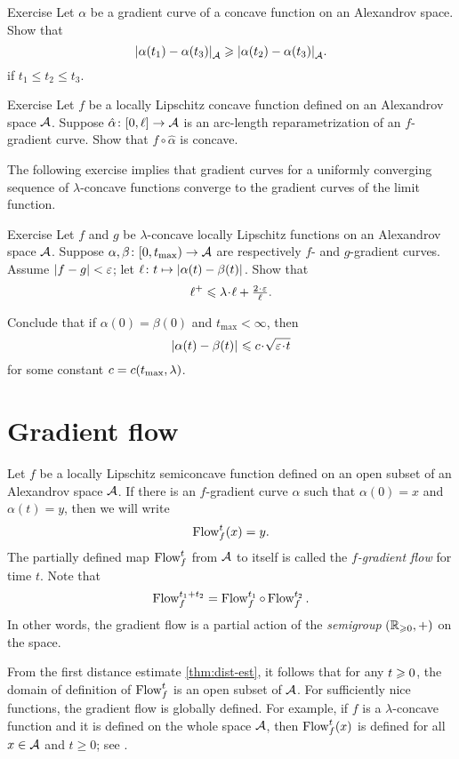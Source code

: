 \begin{thm}{Exercise}\label{ex:elf-contracting}
Let $\alpha$ be a gradient curve of a concave function on an Alexandrov space.
Show that
\[|{\alpha(t_1)}-{\alpha(t_3)}|_{\mathcal{A}}^{{}}\geqslant |{\alpha(t_2)}-{\alpha(t_3)}|_{\mathcal{A}}^{{}}.\]
if $t_1\le t_2\le t_3$.
\end{thm}

\begin{thm}{Exercise}\label{ex:mayer}
Let $f$ be a locally Lipschitz concave function defined on an Alexandrov space $\mathcal{A}$.
Suppose $\hat\alpha\colon[0,\ell]\to\mathcal{A}$ is an arc-length reparametrization of an $f$-gradient curve.
Show that $f\circ\hat\alpha$ is concave.
\end{thm}




The following exercise implies that gradient curves for a uniformly converging sequence of $\lambda$-concave functions converge to the gradient curves of the limit function.

\begin{thm}{Exercise}\label{lem:fg-dist-est}
Let $f$ and $g$ be $\lambda$-concave locally Lipschitz functions on an Alexandrov space $\mathcal{A}$.
Suppose
$\alpha,\beta\colon[0,t_{\max})\to \mathcal{A}$ are respectively $f$- and $g$-gradient curves.
Assume $|f-g|<\varepsilon$; let $\ell\colon t\mapsto|{\alpha(t)}-{\beta(t)}|_{}^{{}}$.
Show that
\[\ell^+\le \lambda\cdot\ell+\tfrac{2\cdot\eps}{\ell}.\]

Conclude that if $\alpha(0)=\beta(0)$ and $t_{\max}<\infty$, then
\[\dist{\alpha(t)}{\beta(t)}{}
\le
\Const\cdot\sqrt{\eps\cdot t}\]
for some constant $c=c(t_{\max},\lambda)$.
\end{thm}

\section{Gradient flow}

Let $f$ be a locally Lipschitz semiconcave function defined on an open subset of an Alexandrov space $\mathcal{A}$.
If there is an $f$-gradient curve $\alpha$ such that $\alpha(0)=x$ and $\alpha(t)=y$,
then we will write 
\[\mathop{\rm Flow}\nolimits^t_f(x)=y.\]
The partially defined map $\mathop{\rm Flow}\nolimits^t_f$ from $\mathcal{A}$ to itself is called the \emph{$f$-gradient flow} for time $t$.
Note that
\[\mathop{\rm Flow}\nolimits^{t_1+t_2}_f=\mathop{\rm Flow}\nolimits_f^{t_1}\circ\mathop{\rm Flow}\nolimits_f^{t_2}.\]
In other words, the gradient flow is a partial action of the \textit{semigroup} $(\mathbb{R}_{\geqslant0},+)$ on the space.
 
From the first distance estimate \ref{thm:dist-est}, 
it follows that for any $t\geqslant 0$, the domain of definition of $\mathop{\rm Flow}\nolimits^t_f$ is an open subset of $\mathcal{A}$.
For sufficiently nice functions, the gradient flow is globally defined.
For example, if $f$ is a $\lambda$-concave function and it is defined on the whole space $\mathcal{A}$, then $\mathop{\rm Flow}\nolimits^t_f(x)$ is defined for all $x\in \mathcal{A}$ and $t\ge0$;
see \cite[16.19]{alexander-kapovitch-petrunin2024}.

